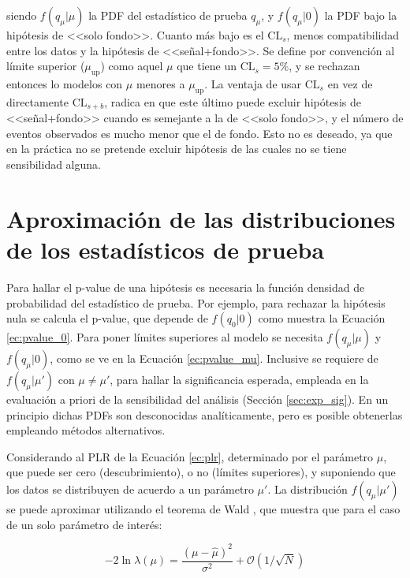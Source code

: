 \noindent
siendo $f(q_\mu|\mu)$ la PDF del estadístico de prueba $q_\mu$, y $f(q_\mu|0)$ la PDF bajo la hipótesis de <<solo fondo>>. Cuanto más bajo es el $\text{CL}_{s}$, menos compatibilidad entre los datos y la hipótesis de <<señal+fondo>>. Se define por convención al límite superior ($\mu_{\text{up}}$) como aquel $\mu$ que tiene un $\text{CL}_{s}=5\%$, y se rechazan entonces lo modelos con $\mu$ menores a $\mu_{\text{up}}$. La ventaja de usar $\text{CL}_{s}$ en vez de directamente $\text{CL}_{s+b}$, radica en que este último puede excluir hipótesis de <<señal+fondo>> cuando es semejante a la de <<solo fondo>>, y el número de eventos observados es mucho menor que el de fondo. Esto no es deseado, ya que en la práctica no se pretende excluir hipótesis de las cuales no se tiene sensibilidad alguna. 




\section{Aproximación de las distribuciones de los estadísticos de prueba}\label{sec:aprox_test}

Para hallar el p-value de una hipótesis es necesaria la función densidad de probabilidad del estadístico de prueba. Por ejemplo, para rechazar la hipótesis nula se calcula el p-value, que depende de $f(q_{0}|0)$ como muestra la Ecuación \ref{ec:pvalue_0}. Para poner límites superiores al modelo se necesita $f(q_{\mu}|\mu)$ y $f(q_{\mu}|0)$, como se ve en la Ecuación \ref{ec:pvalue_mu}. Inclusive se requiere de $f(q_{\mu}|\mu')$ con $\mu\neq\mu'$, para hallar la significancia esperada, empleada en la evaluación a priori de la sensibilidad del análisis (Sección \ref{sec:exp_sig}). En un principio dichas PDFs son desconocidas analíticamente, pero es posible obtenerlas empleando métodos alternativos.

Considerando al PLR de la Ecuación \ref{ec:plr}, determinado por el parámetro $\mu$, que puede ser cero (descubrimiento), o no (límites superiores), y suponiendo que los datos se distribuyen de acuerdo a un parámetro $\mu'$. La distribución $f(q_{\mu}|\mu')$ se puede aproximar utilizando el teorema de Wald \cite{10.2307/1990256}, que muestra que para el caso de un solo parámetro de interés:

\begin{equation}
	-2\ln{\lambda(\mu)}=\frac{(\mu-\hat{\mu})^{2}}{\sigma^{2}}+\mathcal{O}(1/\sqrt{N})
\end{equation}

